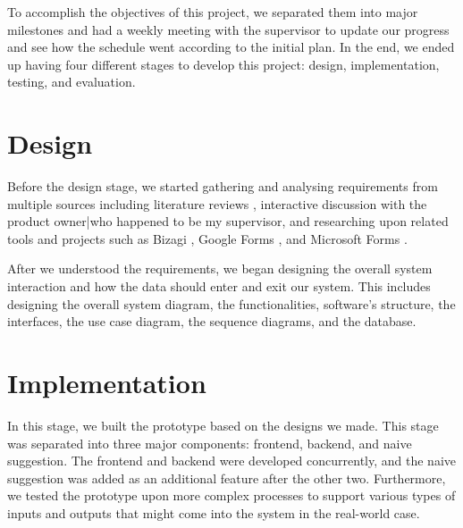 To accomplish the objectives of this project, we separated them into major milestones and had a weekly meeting with the supervisor to update our progress and see how the schedule went according to the initial plan. In the end, we ended up having four different stages to develop this project: design, implementation, testing, and evaluation.

\section{Design}
Before the design stage, we started gathering and analysing requirements from multiple sources including literature reviews \cite{checklistdesign, papapanagiotou2017workflowfm}, interactive discussion with the product owner|who happened to be my supervisor, and researching upon related tools and projects such as Bizagi \cite{bizagi}, Google Forms \cite{googleforms}, and Microsoft Forms \cite{msforms}.

After we understood the requirements, we began designing the overall system interaction and how the data should enter and exit our system. This includes designing the overall system diagram, the functionalities, software's structure, the interfaces, the use case diagram, the sequence diagrams, and the database.


\section{Implementation}
In this stage, we built the prototype based on the designs we made. This stage was separated into three major components: frontend, backend, and naive suggestion. The frontend and backend were developed concurrently, and the naive suggestion was added as an additional feature after the other two. Furthermore, we tested the prototype upon more complex processes to support various types of inputs and outputs that might come into the system in the real-world case.



